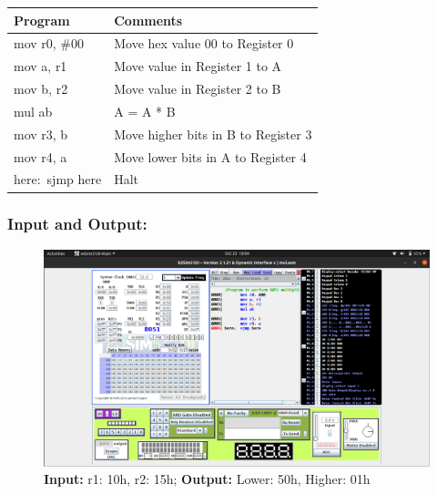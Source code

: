\documentclass[12pt,a4paper]{article}
\begin{document}
\begin{flushleft}
\begin{table}[htb]
\centering
\begin{tabular}{|l|l|} 
\hline
\textbf{Program}                                                 & \textbf{Comments}                             \\ 
\hline
\hline
mov r0, \#00                                                     & Move hex value 00 to Register 0               \\
\hline
mov a, r1                                                        & Move value in Register 1 to A                 \\
\hline
mov b, r2                                                        & Move value in Register 2 to B                 \\
\hline          
mul ab                                                           & A = A * B                                     \\
\hline
mov r3, b                                                        & Move higher bits in B to Register 3           \\
\hline 
mov r4, a                                                        & Move lower bits in A to Register 4            \\
\hline
here:~sjmp here                                                  & Halt                                          \\
\hline
\end{tabular}
\end{table}

\subsubsection*{\textbf{Input and Output:}}
\begin{figure}[h]
    \centering
    \includegraphics[trim = 60mm 75mm 60mm 10mm, clip, width = \textwidth]{Pics/Mul.png}
    \caption{ \textbf{Input:} r1: 10h, r2: 15h; 
              \textbf{Output:} Lower: 50h, Higher: 01h}
\end{figure}
\newpage

\end{flushleft}
\end{document}
